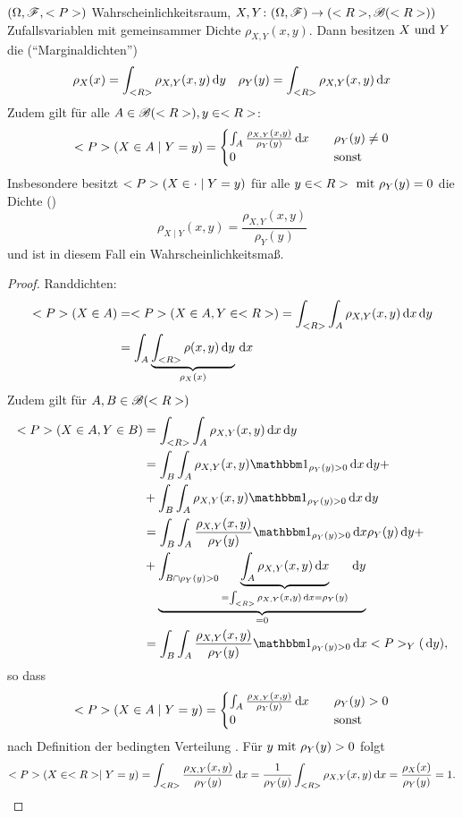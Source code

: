 \begin{proposition}
	$(\O,\F,\P)$ Wahrscheinlichkeitsraum, $X,Y\colon (\O,\F) \to (\R, \borel(\R))$ Zufallsvariablen mit gemeinsammer Dichte $\rho_{X,Y}(x,y)$. Dann besitzen  $X \und Y$ die  (``Marginaldichten'')
	\[
		\rho_X (x) = \int_{\R} \rho_{X,Y}(x,y) \d y \quad \rho_Y (y) = \int_{\R} \rho_{X,Y}(x,y) \d x
	\]
	Zudem gilt für alle $A \in \borel(\R), y \in \R$:
	\[
		\P(X \in A \mid Y=y) = \begin{cases}
		\int_A \frac{\rho_{X,Y}(x,y)}{\rho_Y(y)} \d x &\quad \rho_Y(y) \neq 0\\
		0 &\quad \sonst
		\end{cases}
	\]
	Insbesondere besitzt $\P(X \in \cdot \mid Y =y)$ für alle $y \in \R\mit \rho_Y(y) = 0$ die Dichte ()
	\[
		\rho_{X \mid Y} (x,y) = \frac{\rho_{X,Y}(x,y)}{\rho_Y(y)} 
	\]
	und ist in diesem Fall ein Wahrscheinlichkeitsmaß.
\end{proposition}
\begin{proof}
	Randdichten:
	\begin{align*} 
		\P(X \in A) &= \P(X \in A, Y \in \R) = \int_{\R}\int_A \rho_{X,Y}(x,y) \d x \d y \\%
		&= \int_A \underbrace{\int_{\R} \rho(x,y)\d y}_{\rho_X(x)}\d x
	\end{align*}
	Zudem gilt für $A, B \in \borel(\R)$
	\begin{align*}
		\P(X \in A, Y\in B) &= \int_{\R} \int_A \rho_{X,Y} (x,y) \d x \d y\\
		&= \int_B \int_A \rho_{X,Y} (x,y) \indi_{\rho_Y (y) >0} \d x \d y + \\
		&+\int_B \int_A \rho_{X,Y} (x,y) \indi_{\rho_Y (y) >0} \d x \d y\\
		&= \int_B \int_A \frac{\rho_{X,Y}(x,y)}{\rho_Y(y)} \indi_{\rho_Y (y) >0} \d x \rho_Y(y) \d y + \\
		&+\underbrace{\int_{B \cap \rho_Y(y) >0} \underbrace{\int_A \rho_{X,Y} (x,y) \d x}_{=\int_{\R} \rho_{X,Y}(x,y) \d x = \rho_Y(y)} \d y}_{=0}\\
		&= \int_B \int_A \frac{\rho_{X,Y}(x,y)}{\rho_Y(y)} \indi_{\rho_Y (y) >0} \d x \P_Y(\d y),
		\end{align*}
		so dass
		\begin{align*}
		\P(X \in A \mid Y = y) = \begin{cases}
		\int_A \frac{\rho_{X,Y}(x,y)}{\rho_Y(y)} \d x & \quad \rho_Y(y) >0\\
		0 &\quad \sonst
		\end{cases}
	\end{align*}
	nach Definition der bedingten Verteilung . Für $y \mit \rho_Y(y) > 0$ folgt
	\begin{align*}
		\P(X \in \R \mid Y = y) = \int_{\R} \frac{\rho_{X,Y}(x,y)}{\rho_Y(y)} \d x = \frac{1}{\rho_Y(y)} \int_{\R} \rho_{X,Y}(x,y) \d x = \frac{\rho_X(x)}{\rho_Y(y)} = 1.
	\end{align*}
\end{proof}
